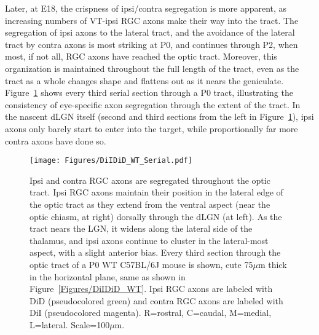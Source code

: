 Later, at E18, the crispness of ipsi/contra segregation is more apparent, as increasing numbers of VT-ipsi RGC axons make their way into the tract.
The segregation of ipsi axons to the lateral tract, and the avoidance of the lateral tract by contra axons is most striking at P0, and continues through P2, when most, if not all, RGC axons have reached the optic tract.
Moreover, this organization is maintained throughout the full length of the tract, even as the tract as a whole changes shape and flattens out as it nears the geniculate.
Figure~\ref{Figures/DiIDiD_WT_Serial} shows every third serial section through a P0 tract, illustrating the consistency of eye-specific axon segregation through the extent of the tract.
In the nascent dLGN itself (second and third sections from the left in Figure~\ref{Figures/DiIDiD_WT_Serial}), ipsi axons only barely start to enter into the target, while proportionally far more contra axons have done so.
\begin{figure}[hbtp]
    \begin{center}
        \texttt{[image: Figures/DiIDiD\_WT\_Serial.pdf]}
        \caption[Ipsi and contra RGC axons are segregated throughout the optic tract.]
        {Ipsi and contra RGC axons are segregated throughout the optic tract.
        Ipsi RGC axons maintain their position in the lateral edge of the optic tract as they extend from the ventral aspect (near the optic chiasm, at right) dorsally through the dLGN (at left).
        As the tract nears the LGN, it widens along the lateral side of the thalamus, and ipsi axons continue to cluster in the lateral-most aspect, with a slight anterior bias.
        Every third section through the optic tract of a P0 WT C57BL/6J mouse is shown, cute 75$\mu$m thick in the horizontal plane, same as shown in Figure~\ref{Figures/DiIDiD_WT}.
        Ipsi RGC axons are labeled with DiD (pseudocolored green) and contra RGC axons are labeled with DiI (pseudocolored magenta).
        R=rostral, C=caudal, M=medial, L=lateral. 
		Scale=100$\mu$m.}
        \label{Figures/DiIDiD_WT_Serial}
    \end{center}
\end{figure}


